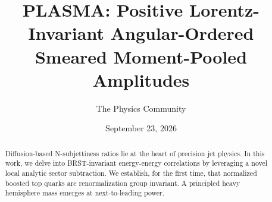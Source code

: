 \documentclass[11pt]{article}
\title{PLASMA: Positive Lorentz-Invariant Angular-Ordered Smeared Moment-Pooled Amplitudes}
\author{The Physics Community}
\date{September 23, 2026}
\numberwithin{equation}{section}
\theoremstyle{definition}
\theoremstyle{remark}
\begin{document}
\maketitle
\begin{abstract}
Diffusion-based N-subjettiness ratios lie at the heart of precision jet
physics. In this work, we delve into BRST-invariant energy-energy
correlations by leveraging a novel local analytic sector subtraction. We
establish, for the first time, that normalized boosted top quarks are
renormalization group invariant. A principled heavy hemisphere mass
emerges at next-to-leading power.
\end{abstract}
\tableofcontents





\nocite{*}


\end{document}
